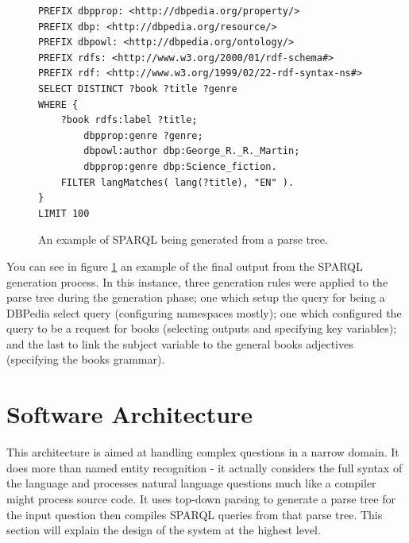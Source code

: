 \documentclass[11pt]{article}
\begin{document}
\begin{figure}[h!]
\begin{verbatim}
PREFIX dbpprop: <http://dbpedia.org/property/>
PREFIX dbp: <http://dbpedia.org/resource/>
PREFIX dbpowl: <http://dbpedia.org/ontology/>
PREFIX rdfs: <http://www.w3.org/2000/01/rdf-schema#>
PREFIX rdf: <http://www.w3.org/1999/02/22-rdf-syntax-ns#>
SELECT DISTINCT ?book ?title ?genre
WHERE {
    ?book rdfs:label ?title;
        dbpprop:genre ?genre;
        dbpowl:author dbp:George_R._R._Martin;
        dbpprop:genre dbp:Science_fiction.
    FILTER langMatches( lang(?title), "EN" ).
}
LIMIT 100
\end{verbatim}
\caption{An example of SPARQL being generated from a parse tree.}
\label{fig:gen_example}
\end{figure}

You can see in figure \ref{fig:gen_example} an example of the final output from the
SPARQL generation process. In this instance, three generation rules were applied to
the parse tree during the generation phase; one which setup the query for being
a DBPedia select query (configuring namespaces mostly); one which configured
the query to be a request for books (selecting outputs and specifying key variables);
and the last to link the subject variable to the general books adjectives (specifying
the books grammar). 

\clearpage

\section{Software Architecture}

This architecture is aimed at handling complex questions in a narrow domain.
It does more than named entity recognition - it actually considers
the full syntax of the language and processes natural language questions
much like a compiler might process source code. It uses
top-down parsing to generate a parse tree for the input question then
compiles SPARQL queries from that parse tree.
This section will explain the design of the system at the highest level.
\end{document}
